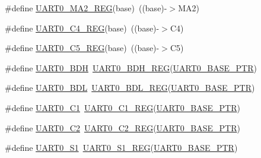 \begin{DoxyCompactItemize}
\item 
\#define \hyperlink{group___u_a_r_t0___register___accessor___macros_ga94d24feeb28228679ff183703948cd1c}{U\+A\+R\+T0\+\_\+\+M\+A2\+\_\+\+R\+EG}(base)~((base)-\/$>$M\+A2)
\item 
\#define \hyperlink{group___u_a_r_t0___register___accessor___macros_ga3f4e82f4aa7ddbd86f04a6acff85b938}{U\+A\+R\+T0\+\_\+\+C4\+\_\+\+R\+EG}(base)~((base)-\/$>$C4)
\item 
\#define \hyperlink{group___u_a_r_t0___register___accessor___macros_ga6ada2400c47eb55801b267941220c48a}{U\+A\+R\+T0\+\_\+\+C5\+\_\+\+R\+EG}(base)~((base)-\/$>$C5)
\item 
\#define \hyperlink{group___u_a_r_t0___register___accessor___macros_ga0f086bea96574c5a4b90ff7ce1a99256}{U\+A\+R\+T0\+\_\+\+B\+DH}~\hyperlink{group___u_a_r_t0___register___accessor___macros_ga92a738cb5fe10aaf02d85fb5c5b6a936}{U\+A\+R\+T0\+\_\+\+B\+D\+H\+\_\+\+R\+EG}(\hyperlink{group___u_a_r_t0___peripheral_ga50a02c91ffbd11fa7b4f0c33fe585199}{U\+A\+R\+T0\+\_\+\+B\+A\+S\+E\+\_\+\+P\+TR})
\item 
\#define \hyperlink{group___u_a_r_t0___register___accessor___macros_ga12ffbaeca152984beb3cbd1edaf94ee2}{U\+A\+R\+T0\+\_\+\+B\+DL}~\hyperlink{group___u_a_r_t0___register___accessor___macros_gab76185bb7da61762628de2ad9b344da0}{U\+A\+R\+T0\+\_\+\+B\+D\+L\+\_\+\+R\+EG}(\hyperlink{group___u_a_r_t0___peripheral_ga50a02c91ffbd11fa7b4f0c33fe585199}{U\+A\+R\+T0\+\_\+\+B\+A\+S\+E\+\_\+\+P\+TR})
\item 
\#define \hyperlink{group___u_a_r_t0___register___accessor___macros_ga74d107fda097e4ca0559efe5ab105cbf}{U\+A\+R\+T0\+\_\+\+C1}~\hyperlink{group___u_a_r_t0___register___accessor___macros_gae73e3f20d2d62db8a394ae91114f482d}{U\+A\+R\+T0\+\_\+\+C1\+\_\+\+R\+EG}(\hyperlink{group___u_a_r_t0___peripheral_ga50a02c91ffbd11fa7b4f0c33fe585199}{U\+A\+R\+T0\+\_\+\+B\+A\+S\+E\+\_\+\+P\+TR})
\item 
\#define \hyperlink{group___u_a_r_t0___register___accessor___macros_gaa96db8ca05ad8075993439b98fc41e04}{U\+A\+R\+T0\+\_\+\+C2}~\hyperlink{group___u_a_r_t0___register___accessor___macros_ga040e10b824110fe8f17ea29b980de16c}{U\+A\+R\+T0\+\_\+\+C2\+\_\+\+R\+EG}(\hyperlink{group___u_a_r_t0___peripheral_ga50a02c91ffbd11fa7b4f0c33fe585199}{U\+A\+R\+T0\+\_\+\+B\+A\+S\+E\+\_\+\+P\+TR})
\item 
\#define \hyperlink{group___u_a_r_t0___register___accessor___macros_ga36c55a027dd65bed765a4620326c669b}{U\+A\+R\+T0\+\_\+\+S1}~\hyperlink{group___u_a_r_t0___register___accessor___macros_gacc27239085f84d5e5e4522405f885258}{U\+A\+R\+T0\+\_\+\+S1\+\_\+\+R\+EG}(\hyperlink{group___u_a_r_t0___peripheral_ga50a02c91ffbd11fa7b4f0c33fe585199}{U\+A\+R\+T0\+\_\+\+B\+A\+S\+E\+\_\+\+P\+TR})

\end{DoxyCompactItemize}
